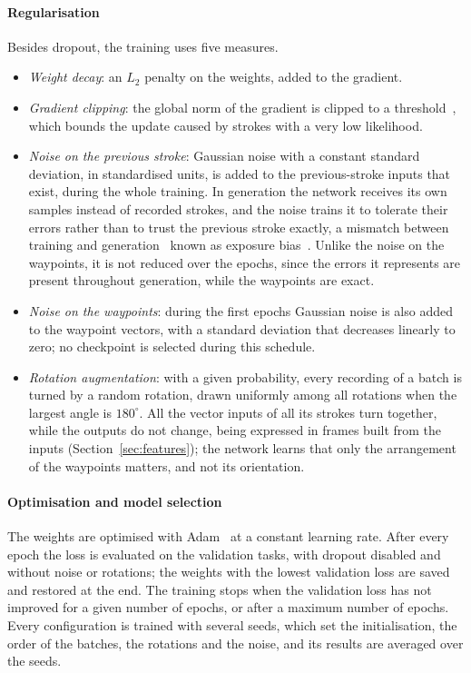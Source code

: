 \documentclass[12pt]{report}
\begin{document}
\paragraph{Regularisation}
Besides dropout, the training uses five measures.
\begin{itemize}
    \item \emph{Weight decay}: an $L_2$ penalty on the weights, added to the gradient.
    \item \emph{Gradient clipping}: the global norm of the gradient is clipped to a threshold~\cite{pascanu2013difficulty}, which bounds the update caused by strokes with a very low likelihood.
    \item \emph{Noise on the previous stroke}: Gaussian noise with a constant standard deviation, in standardised units, is added to the previous-stroke inputs that exist, during the whole training. In generation the network receives its own samples instead of recorded strokes, and the noise trains it to tolerate their errors rather than to trust the previous stroke exactly, a mismatch between training and generation~\cite{bengio2015scheduled} known as exposure bias~\cite{ranzato2016sequence}. Unlike the noise on the waypoints, it is not reduced over the epochs, since the errors it represents are present throughout generation, while the waypoints are exact.
    \item \emph{Noise on the waypoints}: during the first epochs Gaussian noise is also added to the waypoint vectors, with a standard deviation that decreases linearly to zero; no checkpoint is selected during this schedule.
    \item \emph{Rotation augmentation}: with a given probability, every recording of a batch is turned by a random rotation, drawn uniformly among all rotations when the largest angle is $180^\circ$. All the vector inputs of all its strokes turn together, while the outputs do not change, being expressed in frames built from the inputs (Section~\ref{sec:features}); the network learns that only the arrangement of the waypoints matters, and not its orientation.
\end{itemize}

\paragraph{Optimisation and model selection}
The weights are optimised with Adam~\cite{kingma2015adam} at a constant learning rate. After every epoch the loss is evaluated on the validation tasks, with dropout disabled and without noise or rotations; the weights with the lowest validation loss are saved and restored at the end. The training stops when the validation loss has not improved for a given number of epochs, or after a maximum number of epochs. Every configuration is trained with several seeds, which set the initialisation, the order of the batches, the rotations and the noise, and its results are averaged over the seeds.
\end{document}
